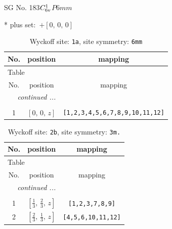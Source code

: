 \documentclass[fleqn,8pt]{jsarticle}
\begin{document}
\setcounter{MaxMatrixCols}{32}

\renewcommand{\tablename}{Table~}
\renewcommand{\figurename}{Figure~}
\begin{center}
\LARGE
SG No. 183\quad$C_{\rm 6v}^{1}$\quad$P6mm$\quad[ hexagonal ]
\end{center}
* plus set:\,\,\,$+\left[ 0,\, 0,\, 0 \right]$
\renewcommand{\arraystretch}{1.2}
\begin{longtable}{ccc}
\caption{Wyckoff site: {\tt 1a}, site symmetry: {\tt 6mm}}
 \\
 \hline \hline
No. & position & mapping \\ \hline \endfirsthead

\multicolumn{2}{l}{\tablename\ \thetable{}} \\
 \hline \hline
No. & position & mapping \\ \hline \endhead

 \hline \hline
\multicolumn{2}{r}{\footnotesize\it continued ...} \\ \endfoot

 \hline \hline
\multicolumn{2}{r}{} \\ \endlastfoot

1 & $\left[ 0,\, 0,\, z \right]$ & {\tt [1,2,3,4,5,6,7,8,9,10,11,12]} \\
\end{longtable}
\renewcommand{\arraystretch}{1.2}
\begin{longtable}{ccc}
\caption{Wyckoff site: {\tt 2b}, site symmetry: {\tt 3m.}}
 \\
 \hline \hline
No. & position & mapping \\ \hline \endfirsthead

\multicolumn{2}{l}{\tablename\ \thetable{}} \\
 \hline \hline
No. & position & mapping \\ \hline \endhead

 \hline \hline
\multicolumn{2}{r}{\footnotesize\it continued ...} \\ \endfoot

 \hline \hline
\multicolumn{2}{r}{} \\ \endlastfoot

1 & $\left[ \frac{1}{3},\, \frac{2}{3},\, z \right]$ & {\tt [1,2,3,7,8,9]} \\ \hline
2 & $\left[ \frac{2}{3},\, \frac{1}{3},\, z \right]$ & {\tt [4,5,6,10,11,12]} \\
\end{longtable}
\renewcommand{\arraystretch}{1.2}
\end{document}

